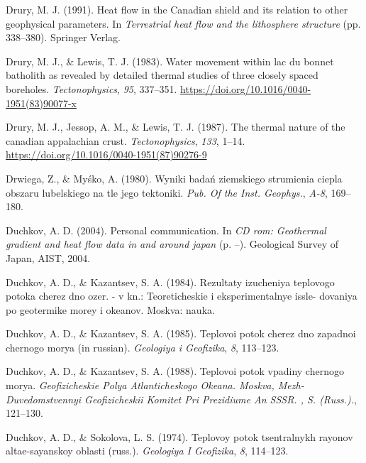 \begin{CSLReferences}{1}{1}
\leavevmode{}%
Drury, M. J. (1991). Heat flow in the {Canadian} shield and its relation to other geophysical parameters. In \emph{Terrestrial heat flow and the lithosphere structure} (pp. 338--380). Springer Verlag.

\leavevmode{}%
Drury, M. J., \& Lewis, T. J. (1983). Water movement within lac du bonnet batholith as revealed by detailed thermal studies of three closely spaced boreholes. \emph{Tectonophysics}, \emph{95}, 337--351. \url{https://doi.org/10.1016/0040-1951(83)90077-x}

\leavevmode{}%
Drury, M. J., Jessop, A. M., \& Lewis, T. J. (1987). The thermal nature of the canadian appalachian crust. \emph{Tectonophysics}, \emph{133}, 1--14. \url{https://doi.org/10.1016/0040-1951(87)90276-9}

\leavevmode{}%
Drwiega, Z., \& Myśko, A. (1980). Wyniki badań ziemskiego strumienia ciepla obszaru lubelskiego na tle jego tektoniki. \emph{Pub. Of the Inst. Geophys.}, \emph{A-8}, 169--180.

\leavevmode{}%
Duchkov, A. D. (2004). Personal communication. In \emph{CD rom: Geothermal gradient and heat flow data in and around japan} (p. --). Geological Survey of Japan, AIST, 2004.

\leavevmode{}%
Duchkov, A. D., \& Kazantsev, S. A. (1984). Rezultaty izucheniya teplovogo potoka cherez dno ozer. - v kn.: Teoreticheskie i eksperimentalnye issle- dovaniya po geotermike morey i okeanov. Moskva: nauka.

\leavevmode{}%
Duchkov, A. D., \& Kazantsev, S. A. (1985). Teplovoi potok cherez dno zapadnoi chernogo morya (in russian). \emph{Geologiya i Geofizika}, \emph{8}, 113--123.

\leavevmode{}%
Duchkov, A. D., \& Kazantsev, S. A. (1988). Teplovoi potok vpadiny chernogo morya. \emph{Geofizicheskie Polya Atlanticheskogo Okeana. Moskva, Mezh- Duvedomstvennyi Geofizicheskii Komitet Pri Prezidiume An SSSR. , S. (Russ.).}, 121--130.

\leavevmode{}%
Duchkov, A. D., \& Sokolova, L. S. (1974). Teplovoy potok tsentralnykh rayonov altae-sayanskoy oblasti (russ.). \emph{Geologiya I Geofizika}, \emph{8}, 114--123.


\end{CSLReferences}
